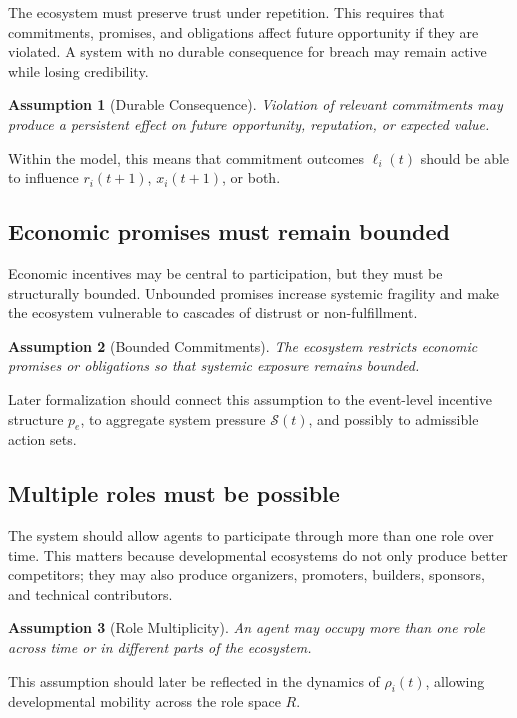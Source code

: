 \documentclass[11pt]{article}
\newtheorem{assumption}{Assumption}
\begin{document}
The ecosystem must preserve trust under repetition. This requires that commitments, promises, and obligations affect future opportunity if they are violated. A system with no durable consequence for breach may remain active while losing credibility.

\begin{assumption}[Durable Consequence]
Violation of relevant commitments may produce a persistent effect on future opportunity, reputation, or expected value.
\end{assumption}

Within the model, this means that commitment outcomes \(\ell_i(t)\) should be able to influence \(r_i(t+1)\), \(x_i(t+1)\), or both.

\subsection{Economic promises must remain bounded}

Economic incentives may be central to participation, but they must be structurally bounded. Unbounded promises increase systemic fragility and make the ecosystem vulnerable to cascades of distrust or non-fulfillment.

\begin{assumption}[Bounded Commitments]
The ecosystem restricts economic promises or obligations so that systemic exposure remains bounded.
\end{assumption}

Later formalization should connect this assumption to the event-level incentive structure \(p_e\), to aggregate system pressure \(\mathcal{S}(t)\), and possibly to admissible action sets.

\subsection{Multiple roles must be possible}

The system should allow agents to participate through more than one role over time. This matters because developmental ecosystems do not only produce better competitors; they may also produce organizers, promoters, builders, sponsors, and technical contributors.

\begin{assumption}[Role Multiplicity]
An agent may occupy more than one role across time or in different parts of the ecosystem.
\end{assumption}

This assumption should later be reflected in the dynamics of \(\rho_i(t)\), allowing developmental mobility across the role space \(R\).
\end{document}
